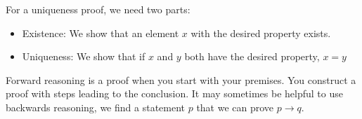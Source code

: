 \documentclass[../discrete.tex]{subfiles}
\begin{document}
For a uniqueness proof, we need two parts:
\begin{itemize}
    \item Existence: We show that an element $x$ with the desired property exists.
    \item Uniqueness: We show that if $x$ and $y$ both have the desired property, $x=y$
\end{itemize}

Forward reasoning is a proof when you start with your premises. You construct a proof with steps 
leading to the conclusion. It may sometimes be helpful to use backwards reasoning, we find a 
statement $p$ that we can prove $p\rightarrow q$. 
\end{document}
